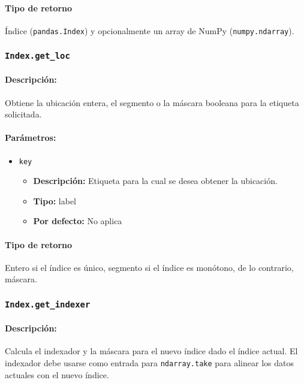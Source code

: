     \paragraph{Tipo de retorno}
    Índice (\texttt{pandas.Index}) y opcionalmente un array de NumPy (\texttt{numpy.ndarray}).



    \subsubsection{\texttt{Index.get\_loc}}

    \paragraph{Descripción:}
    Obtiene la ubicación entera, el segmento o la máscara booleana para la etiqueta solicitada.

    \paragraph{Parámetros:}

    \begin{itemize}
        \item \texttt{key}
            \begin{itemize}
                \item \textbf{Descripción:} Etiqueta para la cual se desea obtener la ubicación.
                \item \textbf{Tipo:} label
                \item \textbf{Por defecto:} No aplica
            \end{itemize}
    \end{itemize}

    \paragraph{Tipo de retorno}
    Entero si el índice es único, segmento si el índice es monótono, de lo contrario, máscara.



    \subsubsection{\texttt{Index.get\_indexer}}

    \paragraph{Descripción:}
    Calcula el indexador y la máscara para el nuevo índice dado el índice actual. El indexador debe usarse como entrada para \texttt{ndarray.take} para alinear los datos actuales con el nuevo índice.

